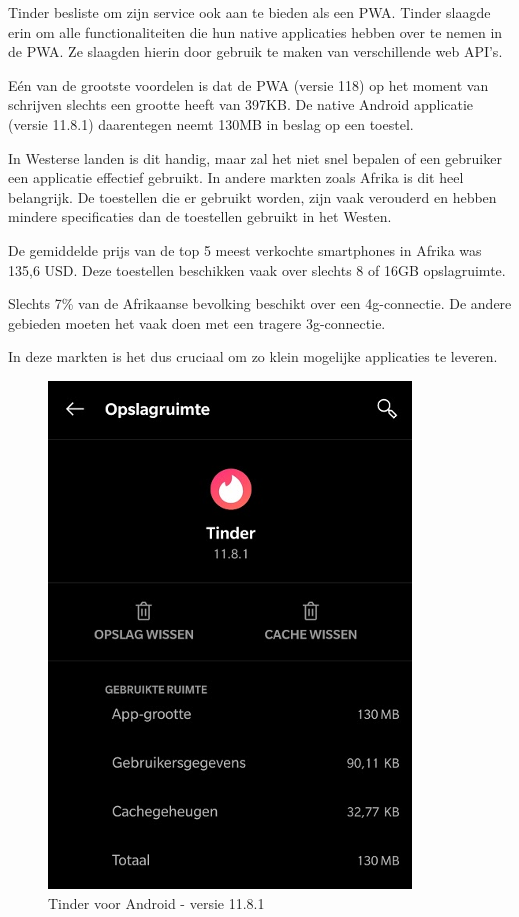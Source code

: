 	Tinder besliste om zijn service ook aan te bieden als een PWA. Tinder slaagde erin om alle functionaliteiten die hun native applicaties hebben over te nemen in de PWA. Ze slaagden hierin door gebruik te maken van verschillende web API's. 
	\autocite{Osmani2017}
	
	Eén van de grootste voordelen is dat de PWA (versie 118) op het moment van schrijven slechts een grootte heeft van 397KB. De native Android applicatie (versie 11.8.1) daarentegen neemt 130MB in beslag op een toestel.
	
	In Westerse landen is dit handig, maar zal het niet snel bepalen of een gebruiker een applicatie effectief gebruikt. In andere markten zoals Afrika is dit heel belangrijk. De toestellen die er gebruikt worden, zijn vaak verouderd en hebben mindere specificaties dan de toestellen gebruikt in het Westen. 
	
	De gemiddelde prijs van de top 5 meest verkochte smartphones in Afrika was 135,6 USD. Deze toestellen beschikken vaak over slechts 8 of 16GB opslagruimte. 
	\autocite{netAdmin2017}
	
	Slechts 7\% van de Afrikaanse bevolking beschikt over een 4g-connectie. De andere gebieden moeten het vaak doen met een tragere 3g-connectie.	
	\autocite{gsmArena2020}

	In deze markten is het dus cruciaal om zo klein mogelijke applicaties te leveren.
	
	\begin{figure}[H]
		\centering
		\includegraphics{./img/tinder_native.png}
		\caption{Tinder voor Android -  versie 11.8.1}
	\end{figure}
	
